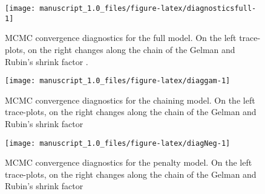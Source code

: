 \documentclass[]{rsos}%
\begin{document}
\begin{figure}

{\centering \texttt{[image: manuscript\_1.0\_files/figure-latex/diagnosticsfull-1]} 

}

\caption{MCMC convergence diagnostics for the full model.
On the left trace-plots, on the right changes along the chain of the
Gelman and Rubin's shrink factor \citep{brooks_General_1998}.}\label{fig:diagnosticsfull}
\end{figure}





\begin{figure}

{\centering \texttt{[image: manuscript\_1.0\_files/figure-latex/diaggam-1]} 

}

\caption{MCMC convergence diagnostics for the chaining model.
On the left trace-plots, on the right changes along the chain of the
Gelman and Rubin's shrink factor \citep{brooks_General_1998}}\label{fig:diaggam}
\end{figure}





\begin{figure}

{\centering \texttt{[image: manuscript\_1.0\_files/figure-latex/diagNeg-1]} 

}

\caption{MCMC convergence diagnostics for the penalty model.
On the left trace-plots, on the right changes along the chain of the
Gelman and Rubin's shrink factor \citep{brooks_General_1998}}\label{fig:diagNeg}
\end{figure}










\end{document}
